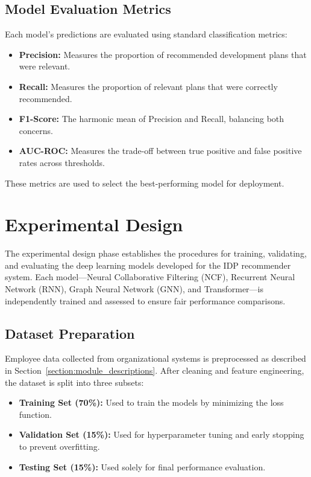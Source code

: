 \subsection{Model Evaluation Metrics}
Each model’s predictions are evaluated using standard classification metrics:
\begin{itemize}
    \item \textbf{Precision:} Measures the proportion of recommended development plans that were relevant.
    \item \textbf{Recall:} Measures the proportion of relevant plans that were correctly recommended.
    \item \textbf{F1-Score:} The harmonic mean of Precision and Recall, balancing both concerns.
    \item \textbf{AUC-ROC:} Measures the trade-off between true positive and false positive rates across thresholds.
\end{itemize}
These metrics are used to select the best-performing model for deployment.

\section{Experimental Design}
\label{section:experimental_design}

The experimental design phase establishes the procedures for training, validating, and evaluating the deep learning models developed for the IDP recommender system. Each model—Neural Collaborative Filtering (NCF), Recurrent Neural Network (RNN), Graph Neural Network (GNN), and Transformer—is independently trained and assessed to ensure fair performance comparisons.

\subsection{Dataset Preparation}
Employee data collected from organizational systems is preprocessed as described in Section~\ref{section:module_descriptions}. After cleaning and feature engineering, the dataset is split into three subsets:
\begin{itemize}
    \item \textbf{Training Set (70\%):} Used to train the models by minimizing the loss function.
    \item \textbf{Validation Set (15\%):} Used for hyperparameter tuning and early stopping to prevent overfitting.
    \item \textbf{Testing Set (15\%):} Used solely for final performance evaluation.
\end{itemize}

